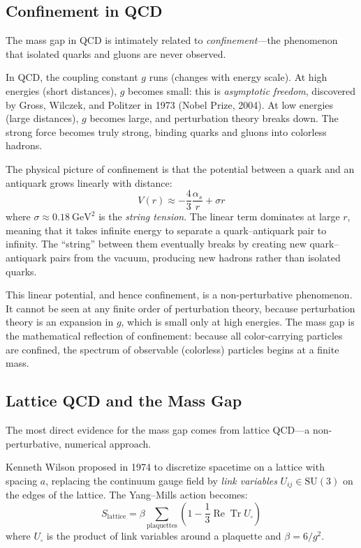 \subsection{Confinement in QCD}

The mass gap in QCD is intimately related to \textit{confinement}---the phenomenon that isolated quarks and gluons are never observed.

In QCD, the coupling constant $g$ runs (changes with energy scale). At high energies (short distances), $g$ becomes small: this is \textit{asymptotic freedom}, discovered by Gross, Wilczek, and Politzer in 1973 (Nobel Prize, 2004). At low energies (large distances), $g$ becomes large, and perturbation theory breaks down. The strong force becomes truly strong, binding quarks and gluons into colorless hadrons.

The physical picture of confinement is that the potential between a quark and an antiquark grows linearly with distance:
\[
V(r) \approx -\frac{4}{3}\frac{\alpha_s}{r} + \sigma r
\]
where $\sigma \approx 0.18~\mathrm{GeV}^2$ is the \textit{string tension}. The linear term dominates at large $r$, meaning that it takes infinite energy to separate a quark--antiquark pair to infinity. The ``string'' between them eventually breaks by creating new quark--antiquark pairs from the vacuum, producing new hadrons rather than isolated quarks.

This linear potential, and hence confinement, is a non-perturbative phenomenon. It cannot be seen at any finite order of perturbation theory, because perturbation theory is an expansion in $g$, which is small only at high energies. The mass gap is the mathematical reflection of confinement: because all color-carrying particles are confined, the spectrum of observable (colorless) particles begins at a finite mass.

\subsection{Lattice QCD and the Mass Gap}

The most direct evidence for the mass gap comes from lattice QCD---a non-perturbative, numerical approach.

Kenneth Wilson proposed in 1974 to discretize spacetime on a lattice with spacing $a$, replacing the continuum gauge field by \textit{link variables} $U_{ij} \in \mathrm{SU}(3)$ on the edges of the lattice. The Yang--Mills action becomes:
\[
S_{\mathrm{lattice}} = \beta \sum_{\text{plaquettes}} \left(1 - \frac{1}{3}\operatorname{Re}\operatorname{Tr} U_{\square}\right)
\]
where $U_{\square}$ is the product of link variables around a plaquette and $\beta = 6/g^2$.

